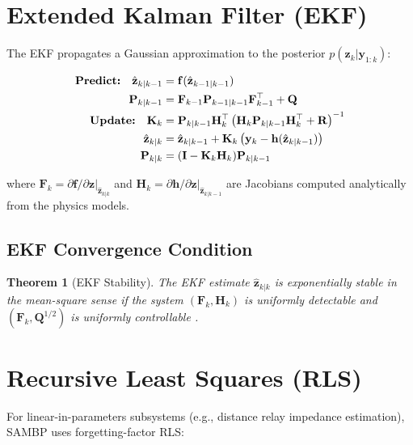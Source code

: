 \documentclass[11pt,a4paper]{report}
\newtheorem{theorem}{Theorem}[chapter]
\newcommand{\sambp}{\textsc{SAMBP}}
\newcommand{\bvec}[1]{\mathbf{#1}}
\begin{document}
\section{Extended Kalman Filter (EKF)}

The EKF propagates a Gaussian approximation to the posterior $p(\bvec{z}_k|\bvec{y}_{1:k})$:

\begin{align}
\text{\textbf{Predict:}}\quad
\hat{\bvec{z}}_{k|k-1} &= \bvec{f}(\hat{\bvec{z}}_{k-1|k-1}) \label{eq:ekf_pred_state}\\
\bvec{P}_{k|k-1} &= \bvec{F}_{k-1}\bvec{P}_{k-1|k-1}\bvec{F}_{k-1}^\top + \bvec{Q} \label{eq:ekf_pred_cov}\\
\text{\textbf{Update:}}\quad
\bvec{K}_k &= \bvec{P}_{k|k-1}\bvec{H}_k^\top\left(\bvec{H}_k\bvec{P}_{k|k-1}\bvec{H}_k^\top + \bvec{R}\right)^{-1} \label{eq:ekf_gain}\\
\hat{\bvec{z}}_{k|k} &= \hat{\bvec{z}}_{k|k-1} + \bvec{K}_k\left(\bvec{y}_k - \bvec{h}(\hat{\bvec{z}}_{k|k-1})\right) \label{eq:ekf_update}\\
\bvec{P}_{k|k} &= (\bvec{I} - \bvec{K}_k\bvec{H}_k)\bvec{P}_{k|k-1} \label{eq:ekf_cov}
\end{align}

where $\bvec{F}_k = \partial\bvec{f}/\partial\bvec{z}|_{\hat{\bvec{z}}_{k|k}}$ and $\bvec{H}_k = \partial\bvec{h}/\partial\bvec{z}|_{\hat{\bvec{z}}_{k|k-1}}$ are Jacobians computed analytically from the physics models.

\subsection{EKF Convergence Condition}

\begin{theorem}[EKF Stability]
The EKF estimate $\hat{\bvec{z}}_{k|k}$ is exponentially stable in the mean-square sense if the system $(\bvec{F}_k, \bvec{H}_k)$ is uniformly detectable and $(\bvec{F}_k, \bvec{Q}^{1/2})$ is uniformly controllable \cite{reif1999}.
\end{theorem}

\section{Recursive Least Squares (RLS)}

For linear-in-parameters subsystems (e.g., distance relay impedance estimation), \sambp{} uses forgetting-factor RLS:
\end{document}
